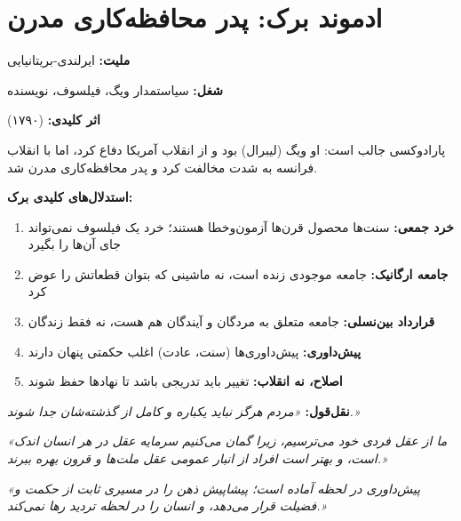 \section{ادموند برک: پدر محافظه‌کاری مدرن}

\begin{personbox}

\textbf{ملیت:} ایرلندی-بریتانیایی

\textbf{شغل:} سیاستمدار ویگ، فیلسوف، نویسنده

\textbf{اثر کلیدی:}  (۱۷۹۰)

\mediumspace

 پارادوکسی جالب است: او ویگ (لیبرال) بود و از انقلاب آمریکا دفاع کرد، اما با انقلاب فرانسه به شدت مخالفت کرد و پدر محافظه‌کاری مدرن شد.

\textbf{استدلال‌های کلیدی برک:}
\begin{enumerate}[nosep]
    \item \textbf{خرد جمعی:} سنت‌ها محصول قرن‌ها آزمون‌وخطا هستند؛ خرد یک فیلسوف نمی‌تواند جای آن‌ها را بگیرد
    \item \textbf{جامعه ارگانیک:} جامعه موجودی زنده است، نه ماشینی که بتوان قطعاتش را عوض کرد
    \item \textbf{قرارداد بین‌نسلی:} جامعه متعلق به مردگان و آیندگان هم هست، نه فقط زندگان
    \item \textbf{پیش‌داوری:} پیش‌داوری‌ها (سنت، عادت) اغلب حکمتی پنهان دارند
    \item \textbf{اصلاح، نه انقلاب:} تغییر باید تدریجی باشد تا نهادها حفظ شوند
\end{enumerate}

\mediumspace

\textbf{نقل‌قول:} \textit{«مردم هرگز نباید یکباره و کامل از گذشته‌شان جدا شوند.»}
\end{personbox}

\begin{quotebox}
\textit{«ما از عقل فردی خود می‌ترسیم، زیرا گمان می‌کنیم سرمایه عقل در هر انسان اندک است، و بهتر است افراد از انبار عمومی عقل ملت‌ها و قرون بهره ببرند.»}
\end{quotebox}

\begin{quotebox}
\textit{«پیش‌داوری در لحظه آماده است؛ پیشاپیش ذهن را در مسیری ثابت از حکمت و فضیلت قرار می‌دهد، و انسان را در لحظه تردید رها نمی‌کند.»}
\end{quotebox}

